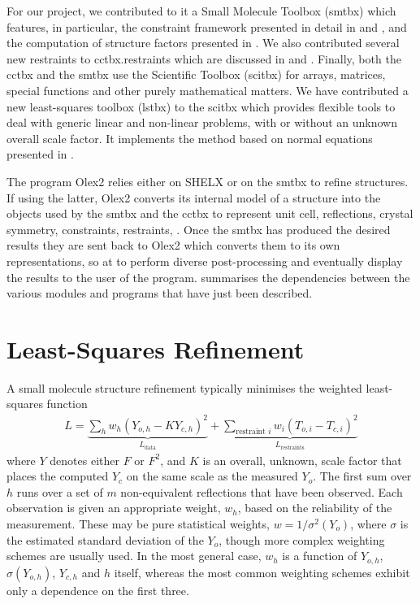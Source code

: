 \documentclass[pdf]{iucr}
\begin{document}
For our project, we contributed to it a Small Molecule Toolbox (smtbx) which features, in particular, the constraint framework presented in detail in  and , and the computation of structure factors presented in . We also contributed several new restraints to cctbx.restraints which are discussed in  and . Finally, both the cctbx and the smtbx use the Scientific Toolbox (scitbx) for arrays, matrices, special functions and other purely mathematical matters. We have contributed a new least-squares toolbox (lstbx) to the scitbx which provides flexible tools to deal with generic linear and non-linear problems, with or without an unknown overall scale factor. It implements the method based on normal equations presented in .

The program Olex2 relies either on SHELX or on the smtbx to refine structures. If using the latter, Olex2 converts its internal model of a structure into the objects used by the smtbx and the cctbx to represent unit cell, reflections, crystal symmetry, constraints, restraints, . Once the smtbx has produced the desired results they are sent back to Olex2 which converts them to its own representations, so at to perform diverse post-processing and eventually display the results to the user of the program.  summarises the dependencies between the various modules and programs that have just been described.  

\section{Least-Squares Refinement}
\newcommand{\data}{\text{data}}
\newcommand{\restraints}{\text{restraints}}

A small molecule structure refinement typically minimises the weighted least-squares function
\begin{align}
L = \underbrace{\sum_h w_h \left( Y_{o,h} - K Y_{c,h} \right)^2}_{L_\data} + \underbrace{\sum_{\text{restraint } i} w_i \left( T_{o,i} - T_{c,i} \right)^2}_{L_\restraints}
\label{eqn:L:def}
\end{align}
where $Y$ denotes either $F$ or $F^2$, and $K$ is an overall, unknown, scale factor that places the computed $Y_c$ on the same scale as the measured $Y_o$. The first sum over $h$ runs over a set of $m$ non-equivalent reflections that have been observed. Each observation is given an appropriate weight, $w_h$, based on the reliability of the measurement. These may be pure statistical weights, $w = 1/\sigma^2(Y_o)$, where $\sigma$ is the estimated standard deviation of the $Y_o$, though more complex weighting schemes are usually used. In the most general case, $w_h$ is a function of $Y_{o,h}$, $\sigma(Y_{o,h})$, $Y_{c,h}$ and $h$ itself, whereas the most common weighting schemes exhibit only a dependence on the first three.
\end{document}

